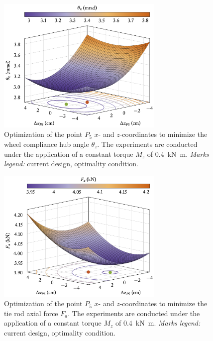 \begin{figure}[htb]
  \centering
  \includegraphics[width=8.0cm]{figures/appendix_4/optimization_hub_angle.png}
  \caption{Optimization of the point $P_5$ $x$- and $z$-coordinates to minimize the wheel compliance hub angle $\theta_z$. The experiments are conducted under the application of a constant torque $M_z$ of \SI{0.4}{\kilo\newton\meter}. \emph{Marks legend:} {\color{mycolor2}\raisebox{-.15pt}{\Large$\bullet$}} current design, {\color{mycolor5}\raisebox{-.15pt}{\Large$\bullet$}} optimality condition.}
  \label{app4:fig:variation_theta_z}
\end{figure}

\begin{figure}[htb]
  \centering
  \includegraphics[width=8.0cm]{figures/appendix_4/optimization_tie_force.png}
  \caption{Optimization of the point $P_5$ $x$- and $z$-coordinates to minimize the tie rod axial force $F_a$. The experiments are conducted under the application of a constant torque $M_z$ of \SI{0.4}{\kilo\newton\meter}. \emph{Marks legend:} {\color{mycolor2}\raisebox{-.15pt}{\Large$\bullet$}} current design, {\color{mycolor5}\raisebox{-.15pt}{\Large$\bullet$}} optimality condition.}
  \label{app4:fig:variation_force_tie}
\end{figure}

